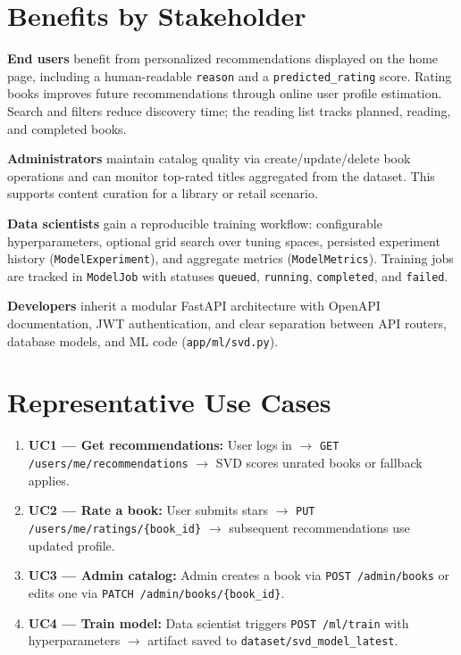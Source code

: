 \documentclass[12pt,a4paper]{report}
\begin{document}
\section{Benefits by Stakeholder}

\textbf{End users} benefit from personalized recommendations displayed on the home page, including a human-readable \texttt{reason} and a \texttt{predicted\_rating} score. Rating books improves future recommendations through online user profile estimation. Search and filters reduce discovery time; the reading list tracks planned, reading, and completed books.

\textbf{Administrators} maintain catalog quality via create/update/delete book operations and can monitor top-rated titles aggregated from the dataset. This supports content curation for a library or retail scenario.

\textbf{Data scientists} gain a reproducible training workflow: configurable hyperparameters, optional grid search over tuning spaces, persisted experiment history (\texttt{ModelExperiment}), and aggregate metrics (\texttt{ModelMetrics}). Training jobs are tracked in \texttt{ModelJob} with statuses \texttt{queued}, \texttt{running}, \texttt{completed}, and \texttt{failed}.

\textbf{Developers} inherit a modular FastAPI architecture with OpenAPI documentation, JWT authentication, and clear separation between API routers, database models, and ML code (\texttt{app/ml/svd.py}).

\section{Representative Use Cases}
\begin{enumerate}
    \item \textbf{UC1 --- Get recommendations:} User logs in $\rightarrow$ \texttt{GET /users/me/recommendations} $\rightarrow$ SVD scores unrated books or fallback applies.
    \item \textbf{UC2 --- Rate a book:} User submits stars $\rightarrow$ \texttt{PUT /users/me/ratings/\{book\_id\}} $\rightarrow$ subsequent recommendations use updated profile.
    \item \textbf{UC3 --- Admin catalog:} Admin creates a book via \texttt{POST /admin/books} or edits one via \texttt{PATCH /admin/books/\{book\_id\}}.
    \item \textbf{UC4 --- Train model:} Data scientist triggers \texttt{POST /ml/train} with hyperparameters $\rightarrow$ artifact saved to \texttt{dataset/svd\_model\_latest}.
\end{enumerate}
\end{document}
